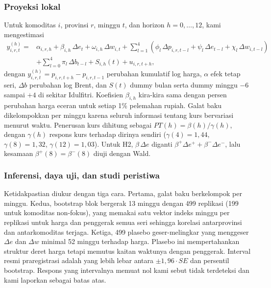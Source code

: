 \documentclass[11pt,a4paper]{article}
\begin{document}
\subsubsection{Proyeksi lokal}
Untuk komoditas $i$, provinsi $r$, minggu $t$, dan horizon $h = 0,\dots,12$, kami mengestimasi
\begin{equation}
\begin{aligned}
y^{(h)}_{i,r,t} = {} & \alpha_{i,r,h} + \beta_{i,h}\,\Delta e_t + \omega_{i,h}\,\Delta w_{i,t}
+ \sum_{l=1}^{4}\left(\phi_{l}\,\Delta p_{i,r,t-l} + \psi_{l}\,\Delta e_{t-l} + \chi_{l}\,\Delta w_{i,t-l}\right) \\
& + \sum_{l=0}^{4}\pi_{l}\,\Delta b_{t-l} + S_{i,h}(t) + u_{i,r,t+h},
\end{aligned}
\label{eq:lp}
\end{equation}
dengan $y^{(h)}_{i,r,t} = p_{i,r,t+h} - p_{i,r,t-1}$ perubahan kumulatif log harga, $\alpha$ efek tetap seri, $\Delta b$
perubahan log Brent, dan $S(t)$ dummy bulan serta dummy minggu $-6$ sampai $+4$ di sekitar Idulfitri. Koefisien $\beta_{i,h}$ kira-kira
sama dengan persen perubahan harga eceran untuk setiap 1\% pelemahan rupiah. Galat baku dikelompokkan per minggu karena seluruh
informasi tentang kurs bervariasi menurut waktu. Penerusan kurs dihitung sebagai $PT(h) = \beta(h)/\gamma(h)$, dengan $\gamma(h)$
respons kurs terhadap dirinya sendiri ($\gamma(4)=1,44$, $\gamma(8)=1,32$, $\gamma(12)=1,03$). Untuk H2, $\beta\,\Delta e$ diganti
$\beta^{+}\Delta e^{+} + \beta^{-}\Delta e^{-}$, lalu kesamaan $\beta^{+}(8)=\beta^{-}(8)$ diuji dengan Wald.

\subsubsection{Inferensi, daya uji, dan studi peristiwa}
Ketidakpastian diukur dengan tiga cara. Pertama, galat baku berkelompok per minggu. Kedua, bootstrap blok bergerak 13 minggu dengan
499 replikasi (199 untuk komoditas non-fokus), yang memakai satu vektor indeks minggu per replikasi untuk harga dan penggerak semua
seri sehingga korelasi antarprovinsi dan antarkomoditas terjaga. Ketiga, 499 plasebo geser-melingkar yang menggeser $\Delta e$ dan
$\Delta w$ minimal 52 minggu terhadap harga. Plasebo ini mempertahankan struktur deret harga tetapi memutus kaitan waktunya dengan
penggerak. Interval resmi praregistrasi adalah yang lebih lebar antara $\pm 1,96\cdot SE$ dan persentil bootstrap. Respons yang
intervalnya memuat nol kami sebut tidak terdeteksi dan kami laporkan sebagai batas atas.
\end{document}
